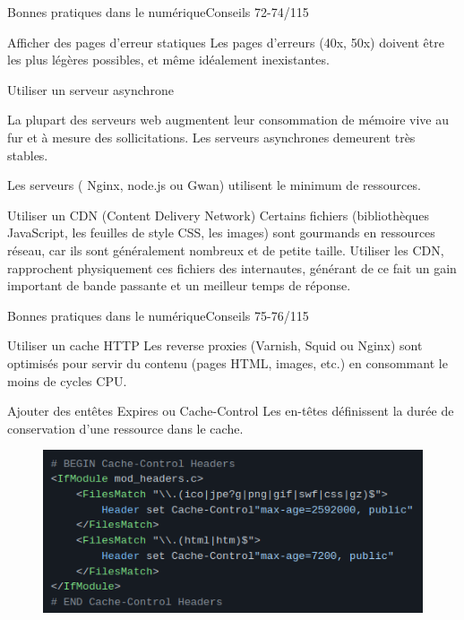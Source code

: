 \begin{frame}{Bonnes pratiques dans le numérique}{Conseils 72-74/115}
\begin{block}{Afficher des pages d'erreur statiques}
Les pages d'erreurs (40x, 50x) doivent être les plus légères possibles, et même idéalement inexistantes. 
\end{block}
\begin{block}{Utiliser un serveur asynchrone}

La plupart des serveurs web augmentent leur consommation de mémoire vive au fur et à mesure des sollicitations. Les serveurs asynchrones demeurent très stables.

Les serveurs ( Nginx, node.js ou Gwan) utilisent le minimum de ressources. 
\end{block}

\begin{block}{Utiliser un CDN (Content Delivery Network)}
Certains fichiers (bibliothèques JavaScript, les feuilles de style CSS, les images) sont gourmands en ressources réseau, car ils sont généralement nombreux et de petite taille. Utiliser les CDN, rapprochent physiquement ces fichiers des internautes, générant de ce fait un gain important de bande passante et un meilleur temps de réponse.
\end{block}


\end{frame}


\begin{frame}{Bonnes pratiques dans le numérique}{Conseils 75-76/115}
\begin{block}{Utiliser un cache HTTP}
Les reverse proxies (Varnish, Squid ou Nginx) sont optimisés pour servir du contenu (pages HTML, images, etc.) en consommant le moins de cycles CPU. 
\end{block}
\begin{block}{Ajouter des entêtes Expires ou Cache-Control}
Les en-têtes définissent la durée de conservation d'une ressource dans le cache.
\begin{figure}
    \centering
    \includegraphics[scale=0.5]{chapitre2/wdd7/fig/c1.png}
\end{figure}
\end{block}
\end{frame}




